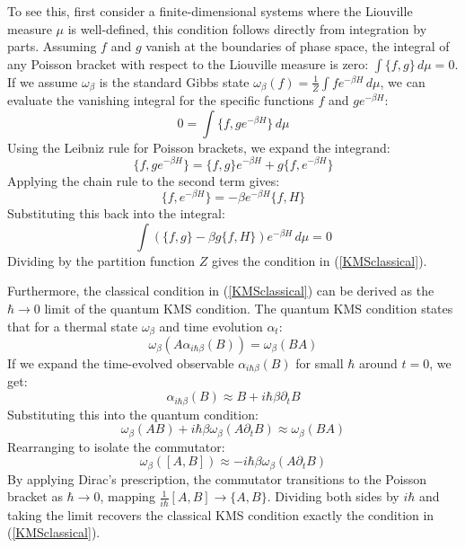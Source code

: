 \documentclass[a4paper,11pt]{article}
\theoremstyle{definition}
\begin{document}
To see this, first consider a finite-dimensional systems where the Liouville measure $\mu$ is well-defined, this condition follows directly from integration by parts. Assuming $f$ and $g$ vanish at the boundaries of phase space, the integral of any Poisson bracket with respect to the Liouville measure is zero: $\int \{f, g\} \, d\mu = 0$. If we assume $\omega_\beta$ is the standard Gibbs state $\omega_\beta(f) = \frac{1}{Z} \int f e^{-\beta H} \, d\mu$, we can evaluate the vanishing integral for the specific functions $f$ and $g e^{-\beta H}$:
\begin{equation}
    0 = \int \{f, g e^{-\beta H}\} \, d\mu
\end{equation}
Using the Leibniz rule for Poisson brackets, we expand the integrand:
\begin{equation}
    \{f, g e^{-\beta H}\} = \{f, g\} e^{-\beta H} + g \{f, e^{-\beta H}\}
\end{equation}
Applying the chain rule to the second term gives:
\begin{equation}
    \{f, e^{-\beta H}\} = -\beta e^{-\beta H} \{f, H\}
\end{equation}
Substituting this back into the integral:
\begin{equation}
    \int \left( \{f, g\} - \beta g \{f, H\} \right) e^{-\beta H} \, d\mu = 0
\end{equation}
Dividing by the partition function $Z$ gives the condition in (\ref{KMSclassical}).

Furthermore, the classical condition in (\ref{KMSclassical}) can be derived as the $\hbar \to 0$ limit of the quantum KMS condition. The quantum KMS condition states that for a thermal state $\omega_\beta$ and time evolution $\alpha_t$:
\begin{equation}
    \omega_\beta(A \alpha_{i\hbar\beta}(B)) = \omega_\beta(B A)
\end{equation}
If we expand the time-evolved observable $\alpha_{i\hbar\beta}(B)$ for small $\hbar$ around $t=0$, we get:
\begin{equation}
    \alpha_{i\hbar\beta}(B) \approx B + i\hbar\beta \partial_t B
\end{equation}
Substituting this into the quantum condition:
\begin{equation}
    \omega_\beta(A B) + i\hbar\beta \omega_\beta(A \partial_t B) \approx \omega_\beta(B A)
\end{equation}
Rearranging to isolate the commutator:
\begin{equation}
    \omega_\beta([A, B]) \approx -i\hbar\beta \omega_\beta(A \partial_t B)
\end{equation}
By applying Dirac's prescription, the commutator transitions to the Poisson bracket as $\hbar \to 0$, mapping $\frac{1}{i\hbar}[A, B] \to \{A, B\}$. Dividing both sides by $i\hbar$ and taking the limit recovers the classical KMS condition exactly the condition in (\ref{KMSclassical}). 
\end{document}
